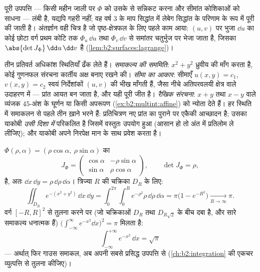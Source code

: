 \begin{remark}
पूरी उपपत्ति --- किसी महीन जाली पर $\Phi$ को उसके  से सन्निकट
करना और सीमांत कोशिकाओं को साधना --- लंबी है, यद्यपि गहरी नहीं; वह
वर्ष 3 के माप सिद्धांत में लेबेग सिद्धांत के परिणाम के रूप में पूरी
की जाती है। अंतर्ज्ञान वही चित्र है जो पृष्ठ-क्षेत्रफल के लिए पहले
काम आया: $(u, v)$ पर भुजा $\dd u$ का कोई छोटा वर्ग प्रथम कोटि तक $\Phi_u\,\dd u$ तथा
$\Phi_v\,\dd v$ से  समांतर चतुर्भुज पर भेजा जाता है, जिसका 
$\abs{\det J_\Phi}\,\dd u\,\dd v$
है (\cref{lem:b2:surfaces:lagrange})।
\end{remark}

\begin{remark}[विधि: चर-परिवर्तन का चुनाव]
तीन प्रतिवर्त अधिकांश स्थितियाँ ढँक लेते हैं। \emph{समाकल्य की
सममिति}: $x^2 + y^2$ ध्रुवीय की माँग करता है, कोई गुणनफल संरचना कार्तीय
अक्ष बनाए रखने की। \emph{सीमा का आकार}: सीमाएँ $u(x,y) = c_1$, $v(x,y) = c_2$ स्वयं
निर्देशांकों $(u, v)$ की भीख माँगती हैं, जैसा नीचे अतिपरवलयी क्षेत्र
वाले उदाहरण में --- प्रांत आयत बन जाता है, और यही पूरी जीत है।
\emph{रैखिक संरचना}: $x + y$ तथा $x - y$ वाले व्यंजक $45$-अंश के घूर्णन या
किसी अपरूपण (\cref{ex:b2:multint:affine}) को न्योता देते हैं। हर स्थिति में समाकलन से पहले
तीन ख़ाने भरने हैं: प्रतिचित्रण नए प्रांत का पुराने पर एकैकी
आच्छादन है; उसका याकोबी \emph{उसी दिशा में} परिकलित है जिसमें
वस्तुतः उपयोग हुआ (आसान हो तो अंत में प्रतिलोम ले लीजिए); और
याकोबी अपने निरपेक्ष मान के साथ प्रवेश करता है।
\end{remark}

\begin{example}[ध्रुवीय निर्देशांक]\label{ex:b2:multint:polar}
$\Phi(\rho, \alpha) = (\rho\cos\alpha,\ \rho\sin\alpha)$ का
\[
J_\Phi = \begin{pmatrix}
\cos\alpha & -\rho\sin\alpha\\
\sin\alpha & \rho\cos\alpha
\end{pmatrix},
\qquad \det J_\Phi = \rho ,
\]
है, अतः $\dd x\,\dd y = \rho\,\dd\rho\,\dd\alpha$। त्रिज्या $R$ की चक्रिका $D_R$ के लिए:
\[
\iint_{D_R} e^{-(x^2 + y^2)}\,\dd x\,\dd y
= \int_0^{2\pi}\!\!\int_0^R e^{-\rho^2}\rho\,\dd\rho\,\dd\alpha
= \pi\bigl(1 - e^{-R^2}\bigr)
\xrightarrow[R\to\infty]{} \pi .
\]
वर्ग $[-R, R]^2$ से तुलना करने पर (जो चक्रिकाओं $D_R$ तथा $D_{R\sqrt2}$ के बीच दबा
है, और सारे समाकल्य धनात्मक हैं) $\bigl(\int_{-\infty}^\infty e^{-x^2}\dd x\bigr)^2 = \pi$ मिलता है:
\[
\boxed{\ \int_{-\infty}^{+\infty} e^{-x^2}\,\dd x = \sqrt{\pi}\ }
\]
--- अर्थात् फिर गाउस समाकल, अब अपनी सबसे प्रसिद्ध उपपत्ति से
(\cref{ch:b2:integration} की एकचर व्युत्पत्ति से तुलना कीजिए)।
\end{example}

